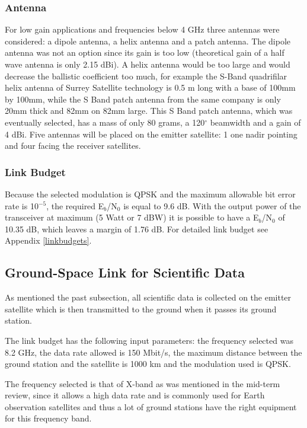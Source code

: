 \subsubsection{Antenna}
For low gain applications and frequencies below 4 GHz three antennas were considered: a dipole antenna, a helix antenna and a patch antenna. The dipole antenna was not an option since its gain is too low (theoretical gain of a half wave antenna is only 2.15 dBi). A helix antenna would be too large and would decrease the ballistic coefficient too much, for example the S-Band quadrifilar helix antenna of Surrey Satellite technology \cite{SurrHelix} is 0.5 m long with a base of 100mm by 100mm, while the S Band patch antenna \cite{SurrPatch} from the same company is only 20mm thick and 82mm on 82mm large. 
This S Band patch antenna, which was eventually selected, has a mass of only 80 grams, a 120$^{\circ}$ beamwidth and a gain of 4 dBi.
Five antennas will be placed on the emitter satellite: 1 one nadir pointing and four facing the receiver satellites.

\subsubsection{Link Budget}
Because the selected modulation is QPSK and the maximum allowable bit error rate is 10$^{-5}$, the required E$_{b}$/N$_{0}$ is equal to 9.6 dB. With the output power of the transceiver at maximum (5 Watt or 7 dBW) it is possible to have a E$_{b}$/N$_{0}$ of 10.35 dB, which leaves a margin of 1.76 dB. For detailed link budget see Appendix \ref{linkbudgets}.

\subsection{Ground-Space Link for Scientific Data}
As mentioned the past subsection, all scientific data is collected on the emitter satellite which is then transmitted to the ground when it passes its ground station.

The link budget has the following input parameters: the frequency selected was 8.2 GHz, the data rate allowed is 150 Mbit/s, the maximum distance between the ground station and the satellite is 1000 km and the modulation used is QPSK.

The frequency selected is that of X-band as was mentioned in the mid-term review, since it allows a high data rate and is commonly used for Earth observation satellites and thus a lot of ground stations have the right equipment for this frequency band.

